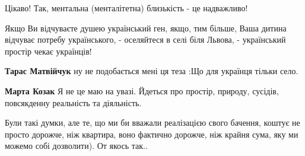\begin{itemize}
 
Цікаво! Так, ментальна (менталітетна\Smiley[1.0][yellow]) близькість - це надважливо!

 

Якщо Ви відчуваєте душею український ген, якщо, тим більше, Ваша дитина
відчуває потребу українського, - оселяйтеся в селі біля Львова, - український
простір чекає українців!

\begin{itemize}
 
\textbf{Тарас Матвійчук} ну не подобається мені ця теза :Що для українця тільки село.

 
\textbf{Марта Козак} Я не це маю на увазі. Йдеться про простір, природу, сусідів, повсякденну реальність та діяльність.

 
Були такі думки, але те, що ми би вважали реалізацією свого бачення, коштує не просто дорожче, ніж квартира, воно фактично дорожче, ніж крайня сума, яку ми можемо собі дозволити). От якось так..

 

\end{itemize}
\end{itemize}
